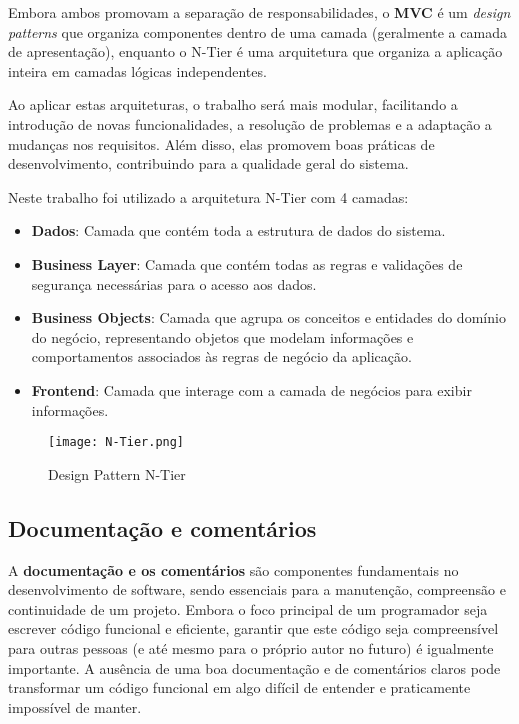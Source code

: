 \documentclass[11pt]{scrartcl} %
\begin{document}
Embora ambos promovam a separação de responsabilidades, o \textbf{MVC} é um \textit{design patterns} que organiza componentes dentro de uma camada (geralmente a camada de apresentação), enquanto o N-Tier é uma arquitetura que organiza a aplicação inteira em camadas lógicas independentes. 

Ao aplicar estas arquiteturas, o trabalho será mais modular, facilitando a introdução de novas funcionalidades, a resolução de problemas e a adaptação a mudanças nos requisitos. Além disso, elas promovem boas práticas de desenvolvimento, contribuindo para a qualidade geral do sistema.

Neste trabalho foi utilizado a arquitetura N-Tier com 4 camadas:

\begin{itemize}
	\item \textbf{Dados}: Camada que contém toda a estrutura de dados do sistema.
	\item \textbf{Business Layer}: Camada que contém todas as regras e validações de segurança necessárias para o acesso aos dados.
	\item \textbf{Business Objects}: Camada que agrupa os conceitos e entidades do domínio do negócio, representando objetos que modelam informações e comportamentos associados às regras de negócio da aplicação.
	\item \textbf{Frontend}: Camada que interage com a camada de negócios para exibir informações.
\end{itemize}

	\begin{figure}[h] %
	\centering
	\texttt{[image: N-Tier.png]}
	\caption{Design Pattern N-Tier} %
	\end{figure}
	
\subsection{Documentação e comentários}

A \textbf{documentação e os comentários} são componentes fundamentais no desenvolvimento de software, sendo essenciais para a manutenção, compreensão e continuidade de um projeto. Embora o foco principal de um programador seja escrever código funcional e eficiente, garantir que este código seja compreensível para outras pessoas (e até mesmo para o próprio autor no futuro) é igualmente importante. A ausência de uma boa documentação e de comentários claros pode transformar um código funcional em algo difícil de entender e praticamente impossível de manter.
\end{document}
